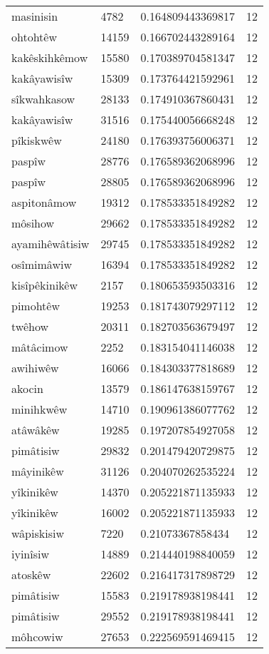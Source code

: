 \begin{longtable}{llll}
masinisin & 4782 & 0.164809443369817 & 12 \\
ohtohtêw & 14159 & 0.166702443289164 & 12 \\
kakêskihkêmow & 15580 & 0.170389704581347 & 12 \\
kakâyawisîw & 15309 & 0.173764421592961 & 12 \\
sîkwahkasow & 28133 & 0.174910367860431 & 12 \\
kakâyawisîw & 31516 & 0.175440056668248 & 12 \\
pîkiskwêw & 24180 & 0.176393756006371 & 12 \\
paspîw & 28776 & 0.176589362068996 & 12 \\
paspîw & 28805 & 0.176589362068996 & 12 \\
aspitonâmow & 19312 & 0.178533351849282 & 12 \\
môsihow & 29662 & 0.178533351849282 & 12 \\
ayamihêwâtisiw & 29745 & 0.178533351849282 & 12 \\
osîmimâwiw & 16394 & 0.178533351849282 & 12 \\
kisîpêkinikêw & 2157 & 0.180653593503316 & 12 \\
pimohtêw & 19253 & 0.181743079297112 & 12 \\
twêhow & 20311 & 0.182703563679497 & 12 \\
mâtâcimow & 2252 & 0.183154041146038 & 12 \\
awihiwêw & 16066 & 0.184303377818689 & 12 \\
akocin & 13579 & 0.186147638159767 & 12 \\
minihkwêw & 14710 & 0.190961386077762 & 12 \\
atâwâkêw & 19285 & 0.197207854927058 & 12 \\
pimâtisiw & 29832 & 0.201479420729875 & 12 \\
mâyinikêw & 31126 & 0.204070262535224 & 12 \\
yîkinikêw & 14370 & 0.205221871135933 & 12 \\
yîkinikêw & 16002 & 0.205221871135933 & 12 \\
wâpiskisiw & 7220 & 0.21073367858434 & 12 \\
iyinîsiw & 14889 & 0.214440198840059 & 12 \\
atoskêw & 22602 & 0.216417317898729 & 12 \\
pimâtisiw & 15583 & 0.219178938198441 & 12 \\
pimâtisiw & 29552 & 0.219178938198441 & 12 \\
môhcowiw & 27653 & 0.222569591469415 & 12 \\

\end{longtable}

